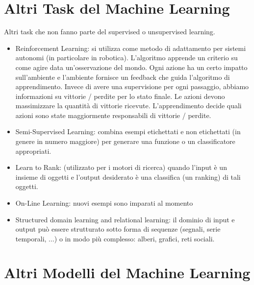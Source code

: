 \documentclass{article}
\begin{document}
\section{Altri Task del Machine Learning}
Altri task che non fanno parte del supervised o unsupervised learning.
\begin{itemize}
    \item Reinforcement Learning: si utilizza come metodo di adattamento per sistemi autonomi (in particolare in robotica). L'algoritmo apprende un criterio su come agire data un'osservazione del mondo. Ogni azione ha un certo impatto sull'ambiente e l'ambiente fornisce un feedback che guida l'algoritmo di apprendimento. Invece di avere una supervisione per ogni passaggio, abbiamo informazioni su vittorie / perdite per lo stato finale. Le azioni devono massimizzare la quantità di vittorie ricevute. L'apprendimento decide quali azioni sono state maggiormente responsabili di vittorie / perdite.
    \item Semi-Supervised Learning: combina esempi etichettati e non etichettati (in genere in numero maggiore) per generare una funzione o un classificatore appropriati.
    \item Learn to Rank: (utilizzato per i motori di ricerca) quando l'input è un insieme di oggetti e l'output desiderato è una classifica (un ranking) di tali oggetti.
    \item On-Line Learning: nuovi esempi sono imparati al momento
    \item Structured domain learning and relational learning: il dominio di input e output può essere strutturato sotto forma di sequenze (segnali, serie temporali, ...) o in modo più complesso: alberi, grafici, reti sociali.
\end{itemize}

\section{Altri Modelli del Machine Learning}
\end{document}
